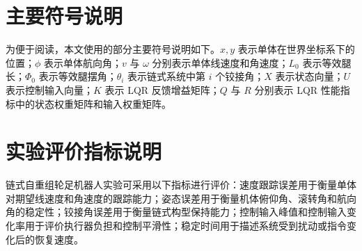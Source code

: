 
\begin{appendices}
  \section{主要符号说明}
  为便于阅读，本文使用的部分主要符号说明如下。$x,y$ 表示单体在世界坐标系下的位置；$\phi$ 表示单体航向角；$v$ 与 $\omega$ 分别表示单体线速度和角速度；$L_0$ 表示等效腿长；$\Phi_0$ 表示等效腿摆角；$\theta_i$ 表示链式系统中第 $i$ 个铰接角；$X$ 表示状态向量；$U$ 表示控制输入向量；$K$ 表示 LQR 反馈增益矩阵；$Q$ 与 $R$ 分别表示 LQR 性能指标中的状态权重矩阵和输入权重矩阵。

  \section{实验评价指标说明}
  链式自重组轮足机器人实验可采用以下指标进行评价：速度跟踪误差用于衡量单体对期望线速度和角速度的跟踪能力；姿态误差用于衡量机体俯仰角、滚转角和航向角的稳定性；铰接角误差用于衡量链式构型保持能力；控制输入峰值和控制输入变化率用于评价执行器负担和控制平滑性；稳定时间用于描述系统受到扰动或指令变化后的恢复速度。

\end{appendices}
